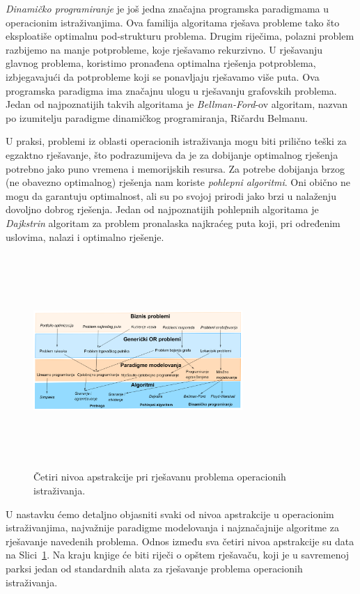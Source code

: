\documentclass[a4paper, utf8, 11pt, colorlinks]{book}
\begin{document}
\emph{Dinamičko programiranje} je još jedna značajna programska paradigmama  u operacionim istraživanjima. Ova familija algoritama rješava probleme tako što eksploatiše optimalnu pod-strukturu problema. Drugim riječima, polazni problem razbijemo na manje potprobleme, koje rješavamo rekurzivno. U rješavanju glavnog problema, koristimo pronađena optimalna rješenja potproblema, izbjegavajući da potprobleme koji se ponavljaju rješavamo više puta. Ova programska paradigma ima značajnu ulogu u rješavanju grafovskih problema. Jedan od najpoznatijih takvih algoritama je \emph{Bellman-Ford}-ov algoritam, nazvan po izumitelju  paradigme dinamičkog programiranja, Ričardu Belmanu. 

U praksi, problemi iz oblasti operacionih istraživanja mogu biti prilično teški za egzaktno rješavanje, što podrazumijeva da je za dobijanje optimalnog rješenja potrebno jako puno vremena i memorijskih resursa. Za potrebe dobijanja brzog (ne obavezno optimalnog) rješenja nam koriste \emph{pohlepni algoritmi}. Oni obično ne mogu 
da garantuju optimalnost, ali su   po svojoj prirodi jako brzi u nalaženju dovoljno dobrog rješenja. Jedan od najpoznatijih pohlepnih algoritama je \emph{Dajkstrin} algoritam za problem pronalaska najkraćeg puta koji, pri određenim uslovima, nalazi i optimalno rješenje. 

\begin{figure}
    \centering
    \includegraphics[width=300, height=230pt]{overview.eps}
    \caption{Četiri nivoa apstrakcije pri rješavanu problema operacionih istraživanja.}
    \label{fig:OR_four_levels}
\end{figure}


U nastavku ćemo detaljno objasniti svaki od nivoa apstrakcije u operacionim istraživanjima, najvažnije paradigme modelovanja i najznačajnije algoritme za rješavanje navedenih problema. Odnos između sva četiri nivoa apstrakcije su data na Slici~\ref{fig:OR_four_levels}. 
 Na kraju knjige će biti riječi o opštem rješavaču, koji je u savremenoj parksi jedan od standardnih alata za rješavanje problema operacionih istraživanja.
 
\end{document}
